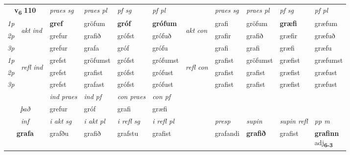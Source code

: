 \noindent
\begin{tabular}{lllllllllll} \toprule
\multicolumn{2}{c}{\textbf{v{\textsubscript{6}}} \Large{\textbf{110}}}  &  \textit{praes sg}  & \textit{praes pl}  &\textit{ pf sg} & \textit{pf pl} &  &  \textit{praes sg}  & \textit{praes pl}  & \textit{pf sg} & \textit{pf pl } \\*
	\cmidrule{3-6} \cmidrule{8-11}
 {\textit{1p}} & \multirow{3}{*}{\begin{turn}{90}\textit{akt ind}\end{turn}} & \textbf{gref} & gröfum & \textbf{gróf} & \textbf{grófum} & \multirow{3}{*}{\begin{turn}{90}\textit{akt con}\end{turn}} &grafi & gröfum & \textbf{græfi} & græfum\\*
 {\textit{2p}} &  &  grefur  & grafið & grófst & grófuð & & grafir & grafið & græfir & græfuð \\*
{\textit{3p}} &  & grefur & grafa & gróf & grófu & & grafi & grafi& græfi & græfu \\*
\cmidrule{3-6} \cmidrule{8-11}
 {\textit{1p}} & \multirow{3}{*}{\begin{turn}{90}\textit{refl ind}\end{turn}}  & grefst & gröfumst & grófst & grófumst & \multirow{3}{*}{\begin{turn}{90}\textit{refl con}\end{turn}}  &grafist & gröfumst & græfist & græfumst \\*
 {\textit{2p}} &  & grefst & grafist & grófst & grófust & &grafist & grafist & græfist & græfust \\*
 {\textit{3p}}  & & grefst & grafast & grófst & grófust & & grafist & grafist& græfist & græfust \\*
\cmidrule{3-6} \cmidrule{8-11}

   & &  \textit{ind praes} & \textit{ind pf} & \textit{con praes} & \textit{con pf} \\*
\multicolumn{2}{c}{ \textit{það} } & grefur & gróf & grafi & græfi \\*

\cmidrule{3-11}
   \multicolumn{2}{c}{\textit{inf}}  & \textit{i akt sg} & \textit{i akt pl} & \textit{i refl sg} & \textit{i refl pl} && \textit{presp} & \textit{supin} & \textit{supin refl} & \textit{pp m} \\*
  \multicolumn{2}{c}{\textbf{grafa}} & grafðu  & grafið & grafstu & grafist && grafandi &  \textbf{grafið} & grafist & \specialcell{\textbf{grafinn} \\ adj\textbf{\textsubscript{6-3}}} \\*
\end{tabular}

